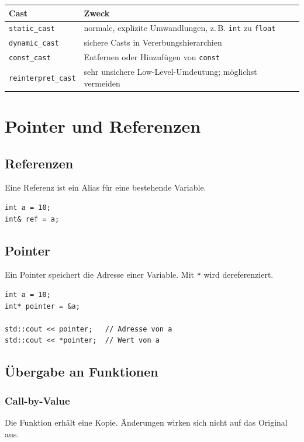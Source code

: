 \documentclass[11pt,a4paper]{article}
\newcommand{\code}[1]{\texttt{#1}}
\begin{document}
\begin{center}
\begin{tabular}{ll}
\toprule
Cast & Zweck \\
\midrule
\code{static\_cast} & normale, explizite Umwandlungen, z.\,B. \code{int} zu \code{float} \\
\code{dynamic\_cast} & sichere Casts in Vererbungshierarchien \\
\code{const\_cast} & Entfernen oder Hinzufügen von \code{const} \\
\code{reinterpret\_cast} & sehr unsichere Low-Level-Umdeutung; möglichst vermeiden \\
\bottomrule
\end{tabular}
\end{center}

\section{Pointer und Referenzen}

\subsection{Referenzen}
Eine Referenz ist ein Alias für eine bestehende Variable.

\begin{lstlisting}[caption={Referenz}]
int a = 10;
int& ref = a;
\end{lstlisting}

\subsection{Pointer}
Ein Pointer speichert die Adresse einer Variable. Mit \code{*} wird dereferenziert.

\begin{lstlisting}[caption={Pointer und Dereferenzierung}]
int a = 10;
int* pointer = &a;

std::cout << pointer;   // Adresse von a
std::cout << *pointer;  // Wert von a
\end{lstlisting}

\subsection{Übergabe an Funktionen}

\subsubsection{Call-by-Value}
Die Funktion erhält eine Kopie. Änderungen wirken sich nicht auf das Original aus.
\end{document}
